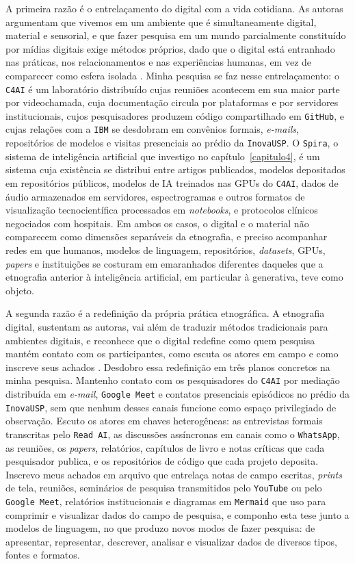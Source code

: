 A primeira razão é o entrelaçamento do digital com a vida cotidiana. As autoras argumentam que vivemos em um ambiente que é simultaneamente digital, material e sensorial, e que fazer pesquisa em um mundo parcialmente constituído por mídias digitais exige métodos próprios, dado que o digital está entranhado nas práticas, nos relacionamentos e nas experiências humanas, em vez de comparecer como esfera isolada \parencite{Pink2016DigitalEthnography}. Minha pesquisa se faz nesse entrelaçamento: o \texttt{C4AI} é um laboratório distribuído cujas reuniões acontecem em sua maior parte por videochamada, cuja documentação circula por plataformas e por servidores institucionais, cujos pesquisadores produzem código compartilhado em \texttt{GitHub}, e cujas relações com a \texttt{IBM} se desdobram em convênios formais, \textit{e-mails}, repositórios de modelos e visitas presenciais ao prédio da \texttt{InovaUSP}. O \texttt{Spira}, o sistema de inteligência artificial que investigo no capítulo~\ref{capitulo4}, é um sistema cuja existência se distribui entre artigos publicados, modelos depositados em repositórios públicos, modelos de IA treinados nas GPUs do \texttt{C4AI}, dados de áudio armazenados em servidores, espectrogramas e outros formatos de visualização tecnocientífica processados em \emph{notebooks}, e protocolos clínicos negociados com hospitais. Em ambos os casos, o digital e o material não comparecem como dimensões separáveis da etnografia, e preciso acompanhar redes em que humanos, modelos de linguagem, repositórios, \emph{datasets}, GPUs, \emph{papers} e instituições se costuram em emaranhados diferentes daqueles que a etnografia anterior à inteligência artificial, em particular à generativa, teve como objeto.

A segunda razão é a redefinição da própria prática etnográfica. A etnografia digital, sustentam as autoras, vai além de traduzir métodos tradicionais para ambientes digitais, e reconhece que o digital redefine como quem pesquisa mantém contato com os participantes, como escuta os atores em campo e como inscreve seus achados \parencite{Pink2016DigitalEthnography}. Desdobro essa redefinição em três planos concretos na minha pesquisa. Mantenho contato com os pesquisadores do \texttt{C4AI} por mediação distribuída em \textit{e-mail}, \texttt{Google Meet} e contatos presenciais episódicos no prédio da \texttt{InovaUSP}, sem que nenhum desses canais funcione como espaço privilegiado de observação. Escuto os atores em chaves heterogêneas: as entrevistas formais transcritas pelo \texttt{Read AI}, as discussões assíncronas em canais como o \texttt{WhatsApp}, as reuniões, os \emph{papers}, relatórios, capítulos de livro e notas críticas que cada pesquisador publica, e os repositórios de código que cada projeto deposita. Inscrevo meus achados em arquivo que entrelaça notas de campo escritas, \textit{prints} de tela, reuniões, seminários de pesquisa transmitidos pelo \texttt{YouTube} ou pelo \texttt{Google Meet}, relatórios institucionais e diagramas em \texttt{Mermaid} que uso para comprimir e visualizar dados do campo de pesquisa, e componho esta tese junto a modelos de linguagem, no que produzo novos modos de fazer pesquisa: de apresentar, representar, descrever, analisar e visualizar dados de diversos tipos, fontes e formatos.

